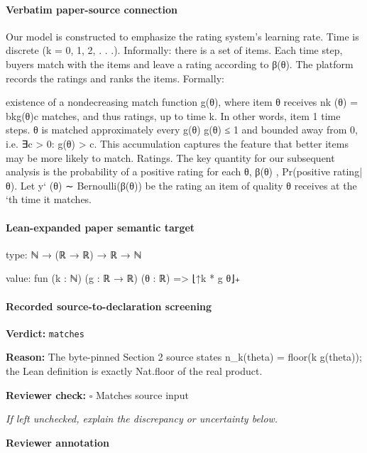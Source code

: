 \documentclass[10pt]{article}
\newcommand{\reviewerbox}{%
  \par\noindent\fbox{\parbox{0.96\linewidth}{\rule{0pt}{0.38in}}}\par
}
\newcommand{\reviewmatch}[1]{%
  \par\noindent\textbf{Reviewer check:} $\square$\; #1\par
  \noindent\emph{If left unchecked, explain the discrepancy or uncertainty below.}\par
}
\begin{document}
\paragraph{Verbatim paper-source connection}
\begin{ReviewVerbatim}
Our model is constructed to emphasize the rating system’s learning rate. Time is discrete (k =
0, 1, 2, . . .). Informally: there is a set of items. Each
time step, buyers match with the items and leave a
rating according to β(θ). The platform records the
ratings and ranks the items. Formally:

existence of a nondecreasing match function g(θ),
where item θ receives nk (θ) = bkg(θ)c matches, and
thus ratings, up to time k. In other words, item
1
time steps.
θ is matched approximately every g(θ)
g(θ) ≤ 1 and bounded away from 0, i.e. ∃c > 0:
g(θ) > c. This accumulation captures the feature
that better items may be more likely to match.
Ratings. The key quantity for our subsequent
analysis is the probability of a positive rating for
each θ, β(θ) , Pr(positive rating|θ). Let y` (θ) ∼
Bernoulli(β(θ)) be the rating an item of quality θ
receives at the `th time it matches.
\end{ReviewVerbatim}



\paragraph{Lean-expanded paper semantic target}
\begin{ReviewVerbatim}
type:
ℕ → (ℝ → ℝ) → ℝ → ℕ

value:
fun (k : ℕ) (g : ℝ → ℝ) (θ : ℝ) => ⌊↑k * g θ⌋₊
\end{ReviewVerbatim}


\paragraph{Recorded source-to-declaration screening}
\textbf{Verdict:} \texttt{matches}
\\
{\raggedright
\textbf{Reason:} The byte-\allowbreak{}pinned Section 2 source states n\_\allowbreak{}k(theta) = floor(k g(theta));\allowbreak{} the Lean definition is exactly Nat.\allowbreak{}floor of the real product.\allowbreak{}
\par}
\reviewmatch{Matches source input}
\noindent\textbf{Reviewer annotation}\par
\reviewerbox
\clearpage
\hypertarget{paper-prerequisite-e99121d097b72110}{}
\end{document}
